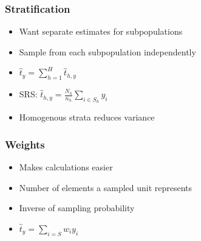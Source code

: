\documentclass{beamer}
\begin{document}
\begin{frame}
  \frametitle{Stratification}

  \begin{itemize}
  \addtolength{\itemsep}{0.5\baselineskip}
  \item Want separate estimates for subpopulations %
  \item Sample from each subpopulation independently
  \item \(\hat{t}_{y} = \sum_{h = 1}^H\hat{t}_{h, y}\) %
  \item SRS: \(\hat{t}_{h, y} = \frac{N_h}{n_h} \sum_{i \in S_h}y_i\)
  \item Homogenous strata reduces variance
  \end{itemize}


  
\end{frame}

\begin{frame}
  \frametitle{Weights}

  \begin{itemize}
  \addtolength{\itemsep}{0.5\baselineskip}
  \item Makes calculations easier
  \item Number of elements a sampled unit represents
  \item Inverse of sampling probability
  \item \(\hat{t}_{y} = \sum_{i = S}w_iy_i\)
  \end{itemize}
  
\end{frame}
\end{document}
